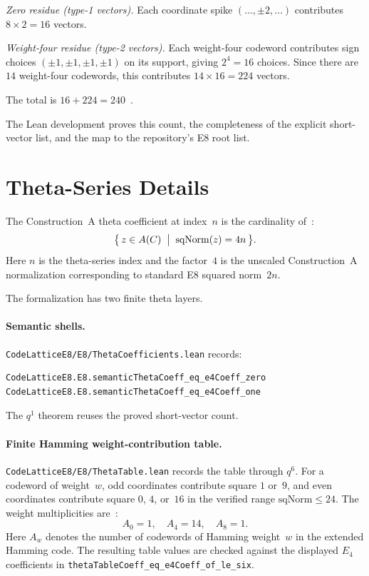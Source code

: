 \documentclass[12pt]{article}
\theoremstyle{definition}
\newcommand{\lean}[1]{\texttt{#1}}
\begin{document}
\medskip
\noindent\textit{Zero residue (type-1 vectors).}
Each coordinate spike $(\ldots,\pm 2,\ldots)$ contributes $8\times 2 = 16$
vectors.

\medskip
\noindent\textit{Weight-four residue (type-2 vectors).}
Each weight-four codeword contributes sign choices $(\pm 1,\pm 1,\pm 1,\pm 1)$
on its support, giving $2^4 = 16$ choices.  Since there are $14$ weight-four
codewords, this contributes $14\times 16 = 224$ vectors.

\medskip
\noindent The total is $16 + 224 = 240$~\cite{ConwaySloane1999}.

The Lean development proves this count, the completeness of the explicit
short-vector list, and the map to the repository's E8 root list.

\section{Theta-Series Details}
\label{app:theta}

The Construction~A theta coefficient at index~$n$ is the cardinality
of~\cite{ConwaySloane1999,LeechSloane1971}:
\[
  \bigl\{\, z \in A(C) \;\bigm|\; \mathrm{sqNorm}(z) = 4n \,\bigr\}.
\]
Here \(n\) is the theta-series index and the factor~\(4\) is the unscaled
Construction~A normalization corresponding to standard E8 squared norm~\(2n\).

The formalization has two finite theta layers.

\paragraph{Semantic shells.}
\lean{CodeLatticeE8/E8/ThetaCoefficients.lean} records:
\begin{lstlisting}[style=lean]
CodeLatticeE8.E8.semanticThetaCoeff_eq_e4Coeff_zero
CodeLatticeE8.E8.semanticThetaCoeff_eq_e4Coeff_one
\end{lstlisting}
The $q^1$ theorem reuses the proved short-vector count.

\paragraph{Finite Hamming weight-contribution table.}
\lean{CodeLatticeE8/E8/ThetaTable.lean} records the table through $q^6$.  For
a codeword of weight~$w$, odd coordinates contribute square $1$ or~$9$, and
even coordinates contribute square $0$, $4$, or~$16$ in the verified range
$\mathrm{sqNorm} \le 24$.  The weight multiplicities are~\cite{MacSloane1977}:
\[
  A_0 = 1, \quad A_4 = 14, \quad A_8 = 1.
\]
Here \(A_w\) denotes the number of codewords of Hamming weight~\(w\) in the
extended Hamming code.
The resulting table values are checked against the displayed $E_4$ coefficients
in \lean{thetaTableCoeff\_eq\_e4Coeff\_of\_le\_six}.
\end{document}
